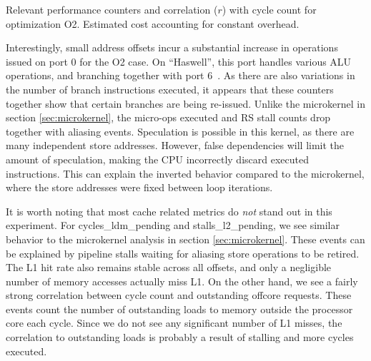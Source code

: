 \documentclass[10pt, conference, compsocconf]{IEEEtran}
\newcommand{\perfctr}[1] {
  {\lowercase{#1}}
}
\begin{document}
\begin{table*}[t]
  \centering
  \caption{Relevant performance counters and correlation ($r$) with cycle count for optimization O2. Estimated cost accounting for constant overhead.\label{tab:convstats}}{
    \pgfplotstabletypeset[
      int detect, %
      col sep=comma,
      columns={Performance counter, Correlation, 0, 2, 4, 8},
      column type=r,
      columns/Performance counter/.style={
        string type, 
        column type=l,
        column type/.add={|}{},
        postproc cell content/.append code={
          \pgfkeysalso{@cell content=\perfctr{##1}}
        }
      },
      columns/Correlation/.style={
        fixed,
        fixed zerofill,
        precision=2
      },
      every head row/.style={
        output empty row,
        before row={\hline
          Performance counter & $r$ & 0 & 2 & 4 & 8 \\
        },
        after row=\hline\hline
      },
      every last row/.style={after row=\hline},
      every last column/.style={column type/.add={}{|}}
    ]{bin/conv-default-o2-haswell.estimate.csv}
  }
\end{table*}

Interestingly, small address offsets incur a substantial increase in operations issued on port 0 for the O2 case.
On ``Haswell'', this port handles various ALU operations, and branching together with port 6~\cite[Figure 2.1]{OptimizationManual}.
As there are also variations in the number of branch instructions executed, it appears that these counters together show that certain branches are being re-issued.
Unlike the microkernel in section \ref{sec:microkernel}, the micro-ops executed and RS stall counts drop together with aliasing events.
Speculation is possible in this kernel, as there are many independent store addresses.
However, false dependencies will limit the amount of speculation, making the CPU incorrectly discard executed instructions.
This can explain the inverted behavior compared to the microkernel, where the store addresses were fixed between loop iterations.

It is worth noting that most cache related metrics do \emph{not} stand out in this experiment.
For cycles\_ldm\_pending and stalls\_l2\_pending, we see similar behavior to the microkernel analysis in section \ref{sec:microkernel}.
These events can be explained by pipeline stalls waiting for aliasing store operations to be retired.
The L1 hit rate also remains stable across all offsets, and only a negligible number of memory accesses actually miss L1.
On the other hand, we see a fairly strong correlation between cycle count and outstanding offcore requests. 
These events count the number of outstanding loads to memory outside the processor core each cycle.
Since we do not see any significant number of L1 misses, the correlation to outstanding loads is probably a result of stalling and more cycles executed.
\end{document}
